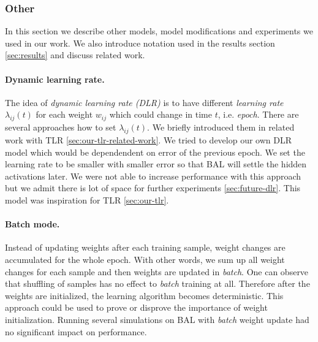 \subsubsection{Other}

In this section we describe other models, model modifications and experiments we used in our work. We also introduce notation used in the results section \ref{sec:results} and discuss related work. 

\paragraph{Dynamic learning rate.} 
\label{sec:our-dynamic-lambda} 
The idea of \emph{dynamic learning rate (DLR)} \citep{jacobs1988increased} is to have different \emph{learning rate} $\lambda_{ij}(t)$ for each weight $w_{ij}$ which could change in time $t$, i.e. \emph{epoch}. There are several approaches how to set $\lambda_{ij}(t)$. We briefly introduced them in related work with TLR \ref{sec:our-tlr-related-work}. We tried to develop our own DLR model which would be dependendent on error of the previous epoch. We set the learning rate to be smaller with smaller error so that BAL will settle the hidden activations later. We were not able to increase performance with this approach but we admit there is lot of space for further experiments \ref{sec:future-dlr}. This model was inspiration for TLR \ref{sec:our-tlr}. 




\paragraph{Batch mode.} Instead of updating weights after each training sample, weight changes are accumulated for the whole epoch. With other words, we sum up all weight changes for each sample and then weights are updated in \emph{batch}. One can observe that shuffling of samples has no effect to \emph{batch} training at all. Therefore after the weights are initialized, the learning algorithm becomes deterministic. This approach could be used to prove or disprove the importance of weight initialization. Running several simulations on BAL with \emph{batch} weight update had no significant impact on performance. 

